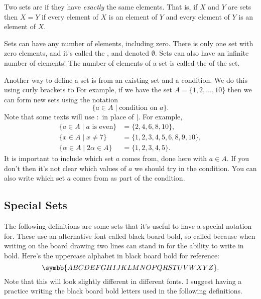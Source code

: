 \documentclass[fleqn]{LectureClass/LectureClass}
\begin{document}
    Two sets are  if they have \emph{exactly} the same elements.
    That is, if \(X\) and \(Y\) are sets then \(X = Y\) if every element of \(X\) is an element of \(Y\) and every element of \(Y\) is an element of \(X\).
    
    Sets can have any number of elements, including zero.
    There is only one set with zero elements, and it's called the , and denoted \(\emptyset\).
    Sets can also have an infinite number of elements!
    The number of elements of a set is called the  of the set.
    
    Another way to define a set is from an existing set and a condition.
    We do this using curly brackets to 
    For example, if we have the set \(A = \{1, 2, \dotsc, 10\}\) then we can form new sets using the notation
    \begin{equation}
        \{a \in A \mid \text{condition on } a\}.
    \end{equation}
    Note that some texts will use \(:\) in place of \(\mid\).
    For example,
    \begin{align}
        \{a \in A \mid a \text{ is even}\} &= \{2, 4, 6, 8, 10\},\\
        \{x \in A \mid x \ne 7\} &= \{1, 2, 3, 4, 5, 6, 8, 9, 10\},\\
        \{\alpha \in A \mid 2\alpha \in A\} &= \{1, 2, 3, 4, 5\}.
    \end{align}
    It is important to include which set \(a\) comes from, done here with \(a \in A\).
    If you don't then it's not clear which values of \(a\) we should try in the condition.
    You can also write which set \(a\) comes from as part of the condition.
    
    \subsection{Special Sets}
    The following definitions are some sets that it's useful to have a special notation for.
    These use an alternative font called black board bold, so called because when writing on the board drawing two lines can stand in for the ability to write in bold.
    Here's the uppercase alphabet in black board bold for reference:
    \begin{equation}
        \symbb{ABCDEFGHIJKLMNOPQRSTUVWXYZ}.
    \end{equation}
    Note that this will look slightly different in different fonts.
    I suggest having a practice writing the black board bold letters used in the following definitions.
    
\end{document}
